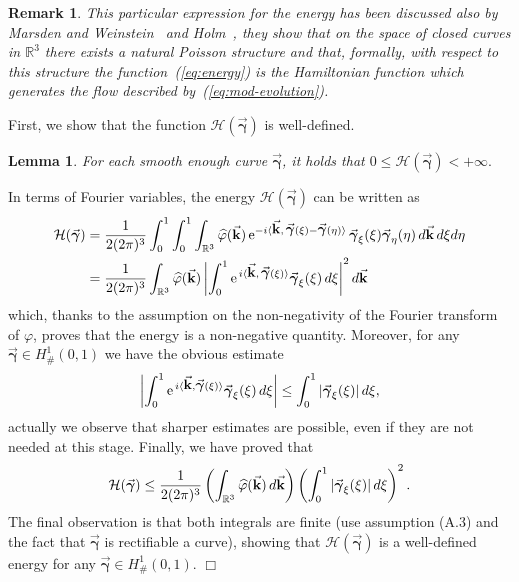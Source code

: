 \documentclass[a4paper,11pt]{article}
\numberwithin{equation}{section}
\newtheorem{lemma}{Lemma}
\newtheorem{remark}{Remark}
\newenvironment{proof}[1][Proof]{{\sc #1.} }{\hfill $\Box$}
\newcommand{\R}{\mathbb{R}}
\newcommand{\la}{\langle}
\newcommand{\ra}{\rangle}
\newcommand{\bgamma}{\mbox{$\vec{\boldsymbol \gamma}$}}
\renewcommand{\k}{\mbox{$\vec{\bf k}$}}
\begin{document}
\begin{remark}
This particular expression for the energy has been
discussed also by Marsden and Weinstein~\cite{mw} and
Holm~\cite{Holm}, they show that on the space of closed curves in
$\R^{3}$ there exists a natural Poisson structure and that, formally,
with respect to this structure the function~(\ref{eq:energy}) is the
Hamiltonian function  which generates the flow described
by~(\ref{eq:mod-evolution}). 
\end{remark}
%
First, we show that the function $\mathcal{H}(\bgamma)$ is
well-defined.  
\begin{lemma}
For each smooth enough curve $\bgamma$, it holds that
$0\leq\mathcal{H}(\bgamma)<+\infty.$
\end{lemma}
\begin{proof}
In terms of Fourier variables, the energy $\mathcal{H}(\bgamma)$ can
be written as
\begin{equation*}
\begin{aligned}
\mathcal{H}(\bgamma)&=
\frac{1}{2(2\pi)^{3}}\int_0^1\int_0^1\int_{\R^3}
\widehat\varphi(\k)\,\text{e}^{-i\la\k,\,\bgamma(\xi)-
\bgamma(\eta)\ra}\, \bgamma_\xi(\xi)
\bgamma_\eta(\eta)\,d\k\,d\xi d\eta\\  
&=\frac{1}{2(2\pi)^{3}}\int_{\R^3} \widehat\varphi(\k) 
\left|\int_0^1\text{e}^{\,i\la \k,\,\bgamma(\xi)\ra}
\bgamma_\xi(\xi)\,d\xi\right|^2 d\k   
\end{aligned}
\end{equation*}
which, thanks to the assumption on the non-negativity of the Fourier
transform of $\varphi$, proves that the energy is a non-negative
quantity. 
%
%
Moreover, for any $\bgamma \in H^1_\#(0,1)$ we have the obvious
estimate 
$$
\left|\int_0^1 \text{e}^{\,i\la\k,\bgamma(\xi)\ra}\bgamma_\xi(\xi)
\,d\xi\right| \le \int_0^1 |\bgamma_\xi(\xi)|\,d\xi, 
$$ 
actually we observe that sharper estimates are possible, even if they
are not needed at this stage. Finally, we have proved that
$$ 
\mathcal{H}(\bgamma) \le
\frac{1}{2(2\pi)^{3}}\left(\int_{\R^3}\widehat\varphi(\k)\,d\k
  \right)\left(\int_0^1 |\bgamma_\xi(\xi)|\,d\xi\right)^2.
$$
The final observation is that both integrals are finite (use
assumption (A.3) and the fact that $\bgamma$ is rectifiable a curve),
showing that $\mathcal{H}(\bgamma)$ is a well-defined energy for any
$\bgamma \in H^1_\#(0,1)$.  
\end{proof}

\vspace{.2cm}
 
\end{document}
